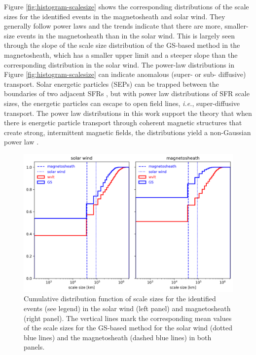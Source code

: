 Figure \ref{fig:histogram-scalesize} shows the corresponding distributions of the scale sizes for the identified events in the magnetosheath and solar wind. They generally follow power laws and the trends indicate that there are more, smaller-size events in the magnetosheath than in the solar wind. This is largely seen through the slope of the scale size distribution of the GS-based method in the magnetosheath, which has a smaller upper limit and a steeper slope than the corresponding distribution in the solar wind. The power-law distributions in Figure \ref{fig:histogram-scalesize} can indicate anomalous (super- or sub- diffusive) transport. Solar energetic particles (SEPs) can be trapped between the boundaries of two adjacent SFRs \citep{leRoux:2023}, but with power law distributions of SFR scale sizes, the energetic particles can escape to open field lines, \textit{i.e.}, super-diffusive transport. The power law distributions in this work support the theory that when there is energetic particle transport through coherent magnetic structures that create strong, intermittent magnetic fields, the distributions yield a non-Gaussian power law \citep{leRoux:2021}.

\begin{figure}
    \centering
    \includegraphics[width=\textwidth]{Figures/Histograms/cdf_scalesize.png}
    \caption[Cumulative distribution function of scale sizes for the identified events]{Cumulative distribution function of scale sizes for the identified events (see legend) in the solar wind (left panel) and magnetosheath (right panel). The vertical lines mark the corresponding mean values of the scale sizes for the GS-based method for the solar wind (dotted blue lines) and the magnetosheath (dashed blue lines) in both panels.}
    \label{fig:cdf-scalesize}
\end{figure}

